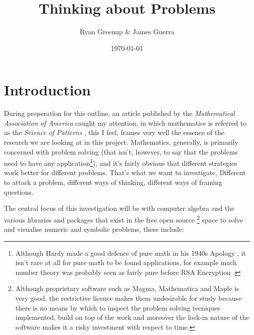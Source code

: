 \documentclass[11pt]{article}
\author{Ryan Greenup \& James Guerra}
\date{\today}
\title{Thinking about Problems}
\begin{document}
\maketitle
\tableofcontents


\section{Introduction}
\label{sec:org74028f8}

During preperation for this outline, an article published by the \emph{Mathematical
Association of America} caught my attention, in which mathematics is referred to
as the \emph{Science of Patterns} \cite{friedMathematicsSciencePatterns2010}, this I
feel, frames very well the essence of the research we are looking at in this
project. Mathematics, generally, is primarily concerned with problem solving
(that isn't, however, to say that the problems need to have any
application\footnote{Although Hardy made a good defence of pure math in his 1940s Apology \cite{hardyMathematicianApology2012}, it isn't rare at all for pure math to be found applications, for example much number theory was probably seen as fairly pure before RSA Encryption \cite{spraulHowSoftwareWorks2015}.}), and it's fairly obvious that different strategies work
better for different problems. That's what we want to investigate, Different to
attack a problem, different ways of thinking, different ways of framing
questions.

The central focus of this investigation will be with computer algebra and the
various libraries and packages that exist in the free open source \footnote{Although proprietary software such as Magma, Mathematica and Maple is very good, the restrictive licence makes them undesirable for study because there is no means by which to inspect the problem solving tecniques implemented, build on top of the work and moreover the lock-in nature of the software makes it a risky investment with respect to time.} space to solve
and visualise numeric and symbolic problems, these include:
\end{document}
